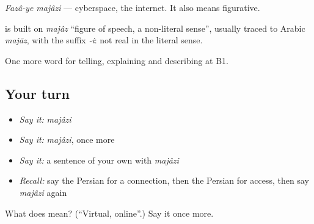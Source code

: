 \emph{Fazâ-ye majâzi} — cyberspace, the internet. It also means figurative.

\begin{cousinweb}
\textbf{} is built on \emph{majâz} \textquotedblleft{}figure of speech, a non-literal sense\textquotedblright{}, usually traced to Arabic \emph{majāz}, with the suffix \emph{-i}: not real in the literal sense.
\end{cousinweb}

\begin{grammarlens}[title={What you've built}]
One more word for telling, explaining and describing at B1.
\end{grammarlens}

\subsection*{Your turn}
\begin{itemize}
\raggedright
  \item \emph{Say it:} \emph{majâzi}
  \item \emph{Say it:} \emph{majâzi}, once more
  \item \emph{Say it:} a sentence of your own with \emph{majâzi}
  \item \emph{Recall:} say the Persian for a connection, then the Persian for access, then say \emph{majâzi} again
\end{itemize}

\begin{tcolorbox}[breakable,colback=teal!4,colframe=teal!35!black,title={Before you move on}]
What does  mean? (\textquotedblleft{}Virtual, online\textquotedblright{}.) Say it once more.
\end{tcolorbox}
